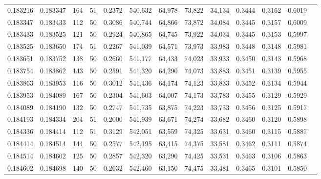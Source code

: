 \begin{tabular}{rrrrrrrrrrrrr}
0.183216 & 0.183347 &   164 &  51 &                                     0.2372 & 540,632 &  64,978 &  73,822 &  34,134 & 0.3444 & 0.3162 & 0.6019 \\
0.183347 & 0.183433 &   112 &  50 &                                     0.3086 & 540,744 &  64,866 &  73,872 &  34,084 & 0.3445 & 0.3157 & 0.6009 \\
0.183433 & 0.183525 &   121 &  50 &                                     0.2924 & 540,865 &  64,745 &  73,922 &  34,034 & 0.3445 & 0.3153 & 0.5997 \\
0.183525 & 0.183650 &   174 &  51 &                                     0.2267 & 541,039 &  64,571 &  73,973 &  33,983 & 0.3448 & 0.3148 & 0.5981 \\
0.183651 & 0.183752 &   138 &  50 &                                     0.2660 & 541,177 &  64,433 &  74,023 &  33,933 & 0.3450 & 0.3143 & 0.5968 \\
0.183754 & 0.183862 &   143 &  50 &                                     0.2591 & 541,320 &  64,290 &  74,073 &  33,883 & 0.3451 & 0.3139 & 0.5955 \\
0.183863 & 0.183953 &   116 &  50 &                                     0.3012 & 541,436 &  64,174 &  74,123 &  33,833 & 0.3452 & 0.3134 & 0.5944 \\
0.183953 & 0.184089 &   167 &  50 &                                     0.2304 & 541,603 &  64,007 &  74,173 &  33,783 & 0.3455 & 0.3129 & 0.5929 \\
0.184089 & 0.184190 &   132 &  50 &                                     0.2747 & 541,735 &  63,875 &  74,223 &  33,733 & 0.3456 & 0.3125 & 0.5917 \\
0.184193 & 0.184334 &   204 &  51 &                                     0.2000 & 541,939 &  63,671 &  74,274 &  33,682 & 0.3460 & 0.3120 & 0.5898 \\
0.184336 & 0.184414 &   112 &  51 &                                     0.3129 & 542,051 &  63,559 &  74,325 &  33,631 & 0.3460 & 0.3115 & 0.5887 \\
0.184414 & 0.184514 &   144 &  50 &                                     0.2577 & 542,195 &  63,415 &  74,375 &  33,581 & 0.3462 & 0.3111 & 0.5874 \\
0.184514 & 0.184602 &   125 &  50 &                                     0.2857 & 542,320 &  63,290 &  74,425 &  33,531 & 0.3463 & 0.3106 & 0.5863 \\
0.184602 & 0.184698 &   140 &  50 &                                     0.2632 & 542,460 &  63,150 &  74,475 &  33,481 & 0.3465 & 0.3101 & 0.5850 \\

\end{tabular}
